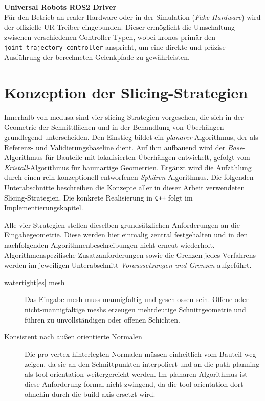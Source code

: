                 \textbf{Universal Robots ROS2 Driver}\\
                Für den Betrieb an realer Hardware oder in der Simulation (\textit{Fake Hardware}) wird der offizielle UR-Treiber eingebunden. 
                Dieser ermöglicht die Umschaltung zwischen verschiedenen Controller-Typen, wobei \ac{kronos} primär den \texttt{joint\_trajectory\_\allowbreak controller} anspricht, um eine direkte und präzise Ausführung der berechneten Gelenkpfade zu gewährleisten.

    \section{Konzeption der Slicing-Strategien}\label{sec:concept-of-slicing-strategies}
        Innerhalb von \ac{medusa} sind vier \gls{slicing}-Strategien vorgesehen, die sich in der Geometrie der Schnittflächen und in der Behandlung von Überhängen grundlegend unterscheiden.
        Den Einstieg bildet ein \emph{planarer} Algorithmus, der als Referenz- und Validierungsbaseline dient.
        Auf ihm aufbauend wird der \emph{Base}-Algorithmus für Bauteile mit lokalisierten Überhängen entwickelt, gefolgt vom \emph{Kristall}-Algorithmus für baumartige Geometrien.
        Ergänzt wird die Aufzählung durch einen rein konzeptionell entworfenen \emph{Sphären}-Algorithmus.
        Die folgenden Unterabschnitte beschreiben die Konzepte aller in dieser Arbeit verwendeten Slicing-Strategien.
        Die konkrete Realisierung in \texttt{C++} folgt im Implementierungskapitel.

        Alle vier Strategien stellen dieselben grundsätzlichen Anforderungen an die Eingabegeometrie.
        Diese werden hier einmalig zentral festgehalten und in den nachfolgenden Algorithmenbeschreibungen nicht erneut wiederholt.
        Algorithmenspezifische Zusatzanforderungen sowie die Grenzen jedes Verfahrens werden im jeweiligen Unterabschnitt \emph{Voraussetzungen und Grenzen} aufgeführt.

        \begin{description}
            \item[{\Gls{watertight}[es] \gls{mesh}}]
                Das Eingabe-\gls{mesh} muss mannigfaltig und geschlossen sein.
                Offene oder nicht-mannigfaltige \glspl{mesh} erzeugen mehrdeutige Schnittgeometrie und führen zu unvollständigen oder offenen Schichten.
            \item[Konsistent nach außen orientierte Normalen]
                Die pro \gls{vertex} hinterlegten Normalen müssen einheitlich vom Bauteil weg zeigen, da sie an den Schnittpunkten interpoliert und an die \gls{path-planning} als \gls{tool-orientation} weitergereicht werden.
                Im planaren Algorithmus ist diese Anforderung formal nicht zwingend, da die \gls{tool-orientation} dort ohnehin durch die \gls{build-axis} ersetzt wird.
        \end{description}

